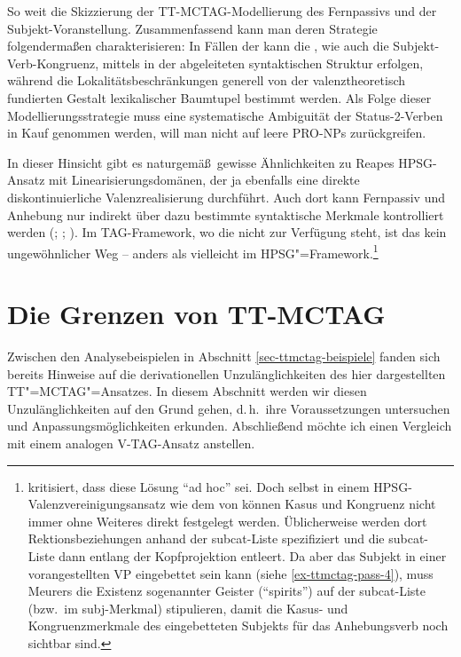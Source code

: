So weit die Skizzierung der TT-MCTAG-Modellierung des Fernpassivs und der Subjekt-Voranstellung. Zusammenfassend kann man deren Strategie folgenderma\ss en charakterisieren: 
In Fällen der  kann die , wie auch die Subjekt-Verb-Kongruenz, mittels  in der abgeleiteten syntaktischen Struktur erfolgen, während die Lokalitätsbeschränkungen generell von der valenztheoretisch fundierten Gestalt lexikalischer Baumtupel bestimmt werden. Als Folge dieser Modellierungsstrategie muss eine systematische Ambiguität der Status-2-Verben in Kauf genommen werden, will man nicht auf leere PRO-NPs zurückgreifen. 

In dieser Hinsicht gibt es naturgemä\ss\ gewisse Ähnlichkeiten zu Reapes HPSG-Ansatz mit Linearisierungsdomänen, der ja ebenfalls eine direkte diskontinuierliche Valenzrealisierung durchführt. Auch dort kann Fernpassiv und Anhebung nur indirekt über dazu bestimmte syntaktische Merkmale kontrolliert werden (\citealt[Abschnitt~5.1]{Kathol:98}; \citealt[Abschnitt~21.1]{Mueller:99}; \citealt[Abschnitt~8.6]{Kathol:00}). Im TAG-Framework, wo die  nicht zur Verfügung steht, ist das kein ungewöhnlicher Weg -- anders als vielleicht im HPSG"=Framework.\footnote{\citet[279]{Mueller:07} kritisiert, dass diese Lösung "`ad hoc"' sei. Doch selbst in einem HPSG-Valenz\-vereinigungs\-ansatz wie dem von \cite{Meurers:99} können Kasus und Kongruenz nicht immer ohne Weiteres direkt festgelegt werden. Üblicherweise werden dort Rektionsbeziehungen anhand der {\sc subcat}-Liste spezifiziert und die {\sc subcat}-Liste dann entlang der Kopfprojektion entleert. Da aber das Subjekt in einer vorangestellten VP eingebettet sein kann (siehe \ref{ex-ttmctag-pass-4}), muss Meurers die Existenz sogenannter Geister ("`spirits"') auf der {\sc subcat}-Liste (bzw.\ im {\sc subj}-Merkmal) stipulieren, damit die Kasus- und Kongruenzmerkmale des eingebetteten Subjekts für das Anhebungsverb noch sichtbar sind.}   



\section{Die Grenzen von TT-MCTAG} \label{sec-ttmctag-grenzen}

Zwischen den Analysebeispielen in Abschnitt \ref{sec-ttmctag-beispiele} fanden sich bereits Hinweise auf die derivationellen Unzulänglichkeiten des hier dargestellten TT"=MCTAG"=Ansatzes. In diesem Abschnitt werden wir diesen Unzulänglichkeiten auf den Grund gehen, d.\,h.\ ihre Voraussetzungen untersuchen und Anpassungsmöglichkeiten erkunden. Abschlie\ss end möchte ich einen Vergleich mit einem analogen V-TAG-Ansatz anstellen.  

